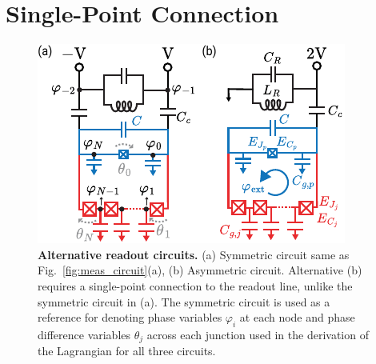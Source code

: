 \documentclass[%
reprint,
superscriptaddress,
 amsmath,amssymb,
 aps,
 prx,
longbibliography,
floatfix,
]{revtex4-2}
\begin{document}
\section{Single-Point Connection}\label{app:alt_circuits}
\begin{figure}[htb]
    \centering
    \includegraphics[width=\linewidth]{Supp_Fig/Circuit_choice.pdf}
    \caption{{\bf Alternative readout circuits.} (a) Symmetric circuit same as Fig.~\ref{fig:meas_circuit}(a), (b) Asymmetric circuit. Alternative (b) requires a single-point connection to the readout line, unlike the symmetric circuit in (a). The symmetric circuit is used as a reference for denoting phase variables $\varphi_i$ at each node and phase difference variables $\theta_j$ across each junction used in the derivation of the Lagrangian for all three circuits.}
    \label{fig:circuit_choice}
\end{figure}
\end{document}
